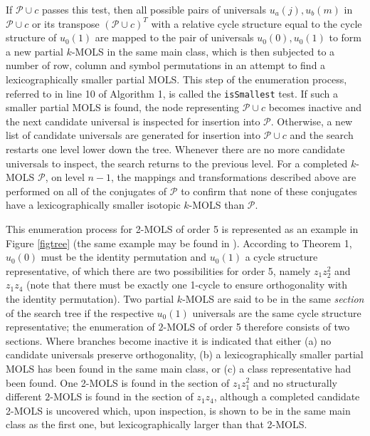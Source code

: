 \documentclass[11pt, a4paper]{article}
\newcommand{\p}{\mathcal{P}}
\newcounter{ls}
\begin{document}
If  $\p \cup c$ passes this test, then  all possible pairs of universals  $u_a{(j)}, u_{b}{(m)}$ in $ \p \cup c$ or its transpose  $(\p \cup c)^T$  with a relative cycle structure equal to the cycle structure of $u_0{(1)}$ are mapped to the pair of universals $u_0{(0)}, u_{0}{(1)}$ to form a new partial $k$-MOLS in the same main class, which is then subjected to a number of row, column and symbol permutations  in an attempt to find a lexicographically smaller partial MOLS. This step of the enumeration process, referred to in line 10 of   Algorithm 1, is called the \texttt{isSmallest} test.
If such a smaller partial MOLS is found, the node representing $\p \cup c$ becomes inactive and the next candidate universal is inspected for insertion into $\p$. Otherwise, a new list of candidate universals are generated for insertion into $\p \cup c$ and the search restarts one level lower down  the tree. Whenever there are no more candidate universals to inspect, the search returns to the previous level.  
For a completed $k$-MOLS $\p$, on  level $n-1$, the mappings and transformations described above are performed on all of the conjugates of $\p$ to confirm that none of these conjugates have a lexicographically smaller isotopic $k$-MOLS than $\p$. 



This enumeration process for 2-MOLS of order 5 is represented as an example in Figure \ref{figtree} (the same example may be found in \cite{Kidd2012}).  According to Theorem 1, $u_0{(0)}$ must be the identity permutation and $u_0{(1)}$ a cycle structure representative, of which there are two possibilities for order 5, namely $z_1z_2^2$ and $z_1z_4$ (note that there must be exactly one 1-cycle to ensure orthogonality with the identity permutation).  Two partial $k$-MOLS are said to be in the same \emph{section} of the search tree if the respective $u_0{(1)}$ universals are the same cycle structure representative; the enumeration of $2$-MOLS of order 5 therefore consists of two sections.
Where branches become inactive it is indicated that either (a) no candidate universals preserve orthogonality,  (b) a lexicographically smaller partial MOLS has been found in the same main class, or   (c) a class representative had been found. 
One 2-MOLS is found in the section of $z_1z_1^2$ and no structurally different $2$-MOLS is found  in the section of $z_1z_4$,  although a completed candidate 2-MOLS is uncovered which, upon inspection, is shown to be in the same main class as the first one, but lexicographically larger than that 2-MOLS.
 
\end{document}
